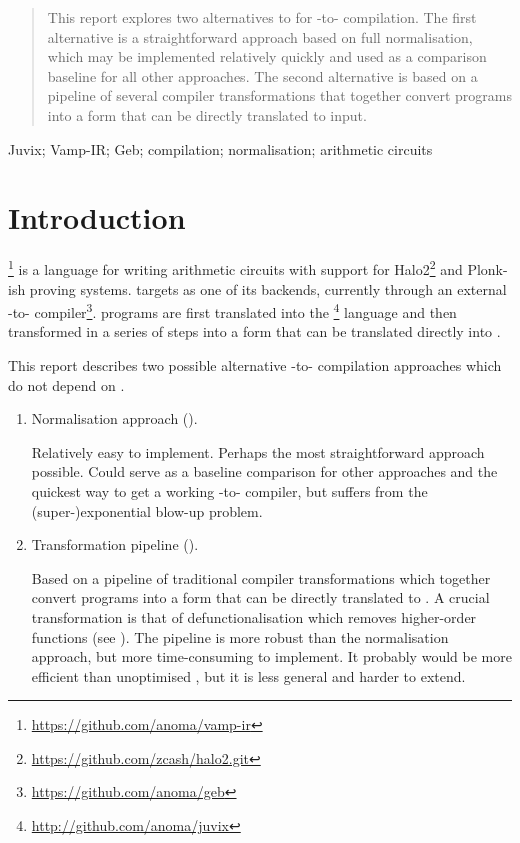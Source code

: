 \documentclass[final]{msc}
\begin{document}


\begin{abstract}
  This report explores two alternatives to \Geb{} for \Juvix{}-to-\VampIR{}
  compilation. The first alternative is a straightforward approach
  based on full normalisation, which may be implemented relatively
  quickly and used as a comparison baseline for all other
  approaches. The second alternative is based on a pipeline of several
  compiler transformations that together convert \Juvix{} programs into
  a form that can be directly translated to \VampIR{} input.
\end{abstract}

\begin{keywords}
Juvix; Vamp-IR; Geb; compilation; normalisation; arithmetic circuits
\end{keywords}
\maketitle

\section{Introduction}\label{sec_introduction}

\VampIR{}\footnote{\url{https://github.com/anoma/vamp-ir}} is a language for writing arithmetic
circuits with support for Halo2\footnote{\url{https://github.com/zcash/halo2.git}} and Plonk-ish proving systems. \Juvix{} targets \VampIR{} as one of its backends, currently
through an external \Geb{}-to-\VampIR{} compiler\footnote{\url{https://github.com/anoma/geb}}. \Juvix{} programs are first
translated into the \JuvixCore{}\footnote{\url{http://github.com/anoma/juvix}} language and then transformed in a
series of steps into a form that can be translated directly into \Geb{}.

This report describes two possible alternative \Juvix{}-to-\VampIR{}
compilation approaches which do not depend on \Geb{}.
\begin{enumerate}
\item Normalisation approach ().

   Relatively easy to implement. Perhaps the most straightforward
   approach possible. Could serve as a baseline comparison for other
   approaches and the quickest way to get a working \Juvix{}-to-\VampIR{}
   compiler, but suffers from the (super-)exponential blow-up problem.
\item Transformation pipeline ().

  Based on a pipeline of traditional compiler transformations which
  together convert \JuvixCore{} programs into a form that can be directly
  translated to \VampIR{}. A crucial transformation is that of
  defunctionalisation which removes higher-order functions (see
  ). The pipeline is more robust
  than the normalisation approach, but more time-consuming to
  implement. It probably would be more efficient than unoptimised \Geb{}, but it is less general and harder to extend.
\end{enumerate}
\end{document}
